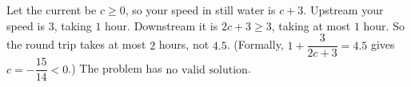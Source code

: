 Let the current be $c\ge0$, so your speed in still water is $c+3$. Upstream your speed is $3$, taking $1$ hour. Downstream it is $2c+3\ge3$, taking at most $1$ hour. So the round trip takes at most $2$ hours, not $4.5$. (Formally, $1+\dfrac3{2c+3}=4.5$ gives $c=-\dfrac{15}{14}<0$.) The problem has $\boxed{\text{no valid solution}}$.
